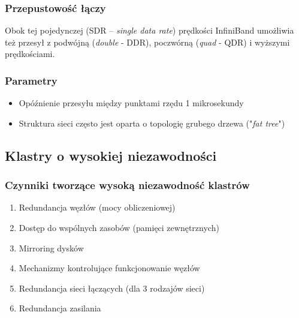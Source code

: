 \documentclass[a4paper,twoside]{article}
\begin{document}
\subsubsection{Przepustowość łączy}
Obok tej pojedynczej (SDR – \emph{single data rate}) prędkości InfiniBand umożliwia też przesył z podwójną (\emph{double} - DDR), poczwórną (\emph{quad} - QDR) i wyższymi prędkościami.
\subsubsection{Parametry}
\begin{itemize}
	\item Opóźnienie przesyłu między punktami rzędu 1 mikrosekundy
	\item Struktura sieci często jest oparta o topologię grubego drzewa ("\emph{fat tree}")
\end{itemize}
\subsection{Klastry o wysokiej niezawodności} \label{subsec:niezawodnoscKlastrow}
\subsubsection{Czynniki tworzące wysoką niezawodność klastrów}
\begin{enumerate}
	\item Redundancja węzłów (mocy obliczeniowej)
	\item Dostęp do wspólnych zasobów (pamięci zewnętrznych)
	\item Mirroring dysków
	\item Mechanizmy kontrolujące funkcjonowanie węzłów
	\item Redundancja sieci łączących (dla 3 rodzajów sieci)
	\item Redundancja zasilania
\end{enumerate}
\end{document}
